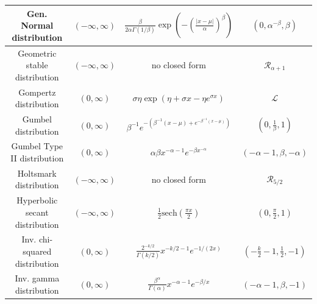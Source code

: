 \documentclass[../thesis.tex]{subfiles}
\begin{document}
{\begin{longtable}{|c|c|c|c|}
      \hline
      Gen. Normal distribution                                              & $(-\infty,\infty)$                                      & $\frac{\beta}{2\alpha\Gamma(1/\beta)}\exp\left(-\left(\frac{|x-\mu|}{\alpha}\right)^{\beta}\right)$                             & $(0,\alpha^{-\beta},\beta)$\tabularnewline
      \hline
      Geometric stable distribution                                         & $(-\infty,\infty)$                                      & no closed form                                                                                                                  & $\mathcal{R}_{\alpha+1}$\tabularnewline
      \hline
      Gompertz distribution                                                 & $(0,\infty)$                                            & $\sigma \eta \exp(\eta + \sigma x - \eta e^{\sigma x})$                                                                         & $\mathcal{L}$\tabularnewline
      \hline
      Gumbel distribution                                                   & $(0,\infty)$                                            & $\beta^{-1} e^{-(\beta^{-1}(x-\mu)+e^{-\beta^{-1}(x-\mu)})}$                                                                    & $(0,\frac{1}{\beta},1)$\tabularnewline
      \hline
      Gumbel Type II distribution                                           & $(0,\infty)$                                            & $\alpha\beta x^{-\alpha-1}e^{-\beta x^{-\alpha}}$                                                                               & $(-\alpha-1,\beta,-\alpha)$\tabularnewline
      \hline
      Holtsmark distribution                                                & $(-\infty,\infty)$                                      & no closed form                                                                                                                  & $\mathcal{R}_{5/2}$\tabularnewline
      \hline
      Hyperbolic secant distribution                                        & $(-\infty,\infty)$                                      & $\frac{1}{2}\text{sech}\left(\frac{\pi x}{2}\right)$                                                                            & $(0,\frac{\pi}{2},1)$\tabularnewline
      \hline
      Inv. chi-squared distribution                                         & $(0,\infty)$                                            & $\frac{2^{-k/2}}{\Gamma(k/2)}x^{-k/2-1}e^{-1/(2x)}$                                                                             & $(-\frac{k}{2}-1,\frac{1}{2},-1)$\tabularnewline
      \hline
      Inv. gamma distribution                                               & $(0,\infty)$                                            & $\frac{\beta^{\alpha}}{\Gamma(\alpha)}x^{-\alpha-1}e^{-\beta/x}$                                                                & $(-\alpha-1,\beta,-1)$\tabularnewline

\end{longtable}}
\end{document}
